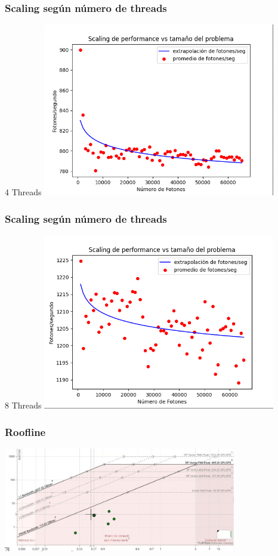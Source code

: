 \documentclass{beamer}
\begin{document}
    \begin{frame}
        \frametitle{Scaling según número de threads}
        4 Threads
        \includegraphics[width=4in]{imagenes/scaling_4threads_alv.png}
    \end{frame}

    \begin{frame}
        \frametitle{Scaling según número de threads}
        8 Threads
        \includegraphics[width=4in]{imagenes/scaling_8threads_alv.png}
    \end{frame}

	\begin{frame}
		\frametitle{Roofline}
		\includegraphics[width=4in]{imagenes/roofline.jpeg}
	\end{frame}
\end{document}
